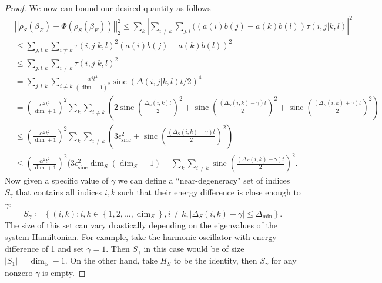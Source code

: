 \documentclass{article}
\newcommand{\parens}[1]{\left( #1 \right)}
\newcommand{\abs}[1]{\left| #1 \right|}
\newcommand{\norm}[1]{\left| \left| #1 \right| \right|}
\newcommand{\set}[1]{\left\{ #1 \right\}}
\DeclareMathOperator{\sinc}{sinc}
\begin{document}
\begin{proof}
We now can bound our desired quantity as follows
\begin{align}
    &\norm{\rho_S(\beta_E) - \Phi(\rho_S(\beta_E))}_2^2 \leq \sum_{k} \abs{\sum_{i \neq k} \sum_{j,l} ((a(i) b(j) -a(k) b(l)) \tau(i,j|k,l)}^2 \\
    &\leq \sum_{j,l,k} \sum_{i \neq k} \tau(i,j|k,l)^2 (a(i) b(j) - a(k) b(l))^2 \\
    &\leq \sum_{j,l,k} \sum_{i \neq k} \tau(i,j|k,l)^2 \\
    &= \sum_{j,l,k} \sum_{i \neq k} \frac{\alpha^4 t^4}{(\dim + 1)^2} \sinc(\Delta(i,j|k,l) t/ 2)^4 \\
    &= \parens{\frac{\alpha^2 t^2}{\dim + 1}}^2 \sum_k \sum_{i \neq k} \parens{2 \sinc\parens{ \frac{\Delta_S(i,k) t}{2}}^2 + \sinc\parens{\frac{(\Delta_S(i,k) - \gamma)t}{2}}^2 + \sinc\parens{\frac{(\Delta_S(i,k) + \gamma)t}{2}}^2} \\
    &\leq \parens{\frac{\alpha^2 t^2}{\dim + 1}}^2 \sum_k \sum_{i \neq k} \parens{3 \epsilon_{\sinc}^2 + \sinc\parens{\frac{(\Delta_S(i,k) - \gamma)t}{2}}^2} \\
    &\leq \parens{\frac{\alpha^2 t^2}{\dim + 1}}^2 (3 \epsilon_{\sinc}^2 \dim_S (\dim_S - 1) + \sum_{k} \sum_{i \neq k} \sinc\parens{\frac{(\Delta_S(i,k) - \gamma)t}{2}}^2.
\end{align}
Now given a specific value of $\gamma$ we can define a ``near-degeneracy" set of indices $S_\gamma$ that contains all indices $i,k$ such that their energy difference is close enough to $\gamma$:
\begin{equation}
    S_\gamma \coloneqq \set{(i,k) : i,k \in \set{1, 2, \ldots, \dim_S}, i \neq k, |\Delta_S(i,k) - \gamma| \leq \Delta_{\min}}.
\end{equation}
The size of this set can vary drastically depending on the eigenvalues of the system Hamiltonian. For example, take the harmonic oscillator with energy difference of 1 and set $\gamma = 1$. Then $S_{\gamma}$ in this case would be of size $|S_{1}| = \dim_S - 1$. On the other hand, take $H_S$ to be the identity, then $S_\gamma$ for any nonzero $\gamma$ is empty. 


\end{proof}
\end{document}
